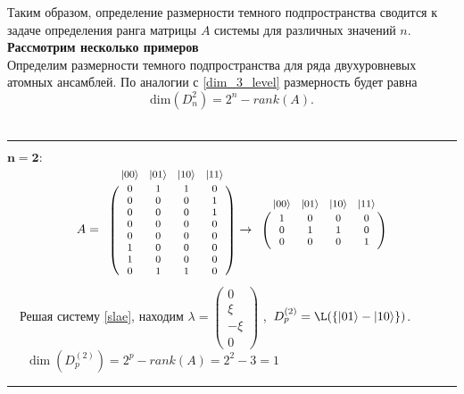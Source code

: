 \noindent Таким образом, определение размерности темного подпространства сводится к задаче определения ранга матрицы $A$ системы для различных значений $n$.
\\[24pt]
\noindent \textbf{Рассмотрим несколько примеров}\\[12pt]
Определим размерности темного подпространства для ряда двухуровневых атомных ансамблей. По аналогии с \eqref{dim_3_level} размерность будет равна
\begin{equation}
\mathrm{dim}(D_{n}^{2}) = 2^{n} - rank(A).
\end{equation}
\
\\
\medskip\hrule\medskip
\noindent$\mathbf{n = 2:}$
\begin{equation}\label{eq:matrix2}
	{\footnotesize
		A =
		\bordermatrix{
			& |00\ra & |01\ra & |10\ra & |11\ra \cr
			& 0 & 1 & 1 & 0 \cr
			& 0 & 0 & 0 & 1 \cr
			& 0 & 0 & 0 & 1 \cr
			& 0 & 0 & 0 & 0 \cr
			& 0 & 0 & 0 & 0 \cr
			& 1 & 0 & 0 & 0 \cr
			& 1 & 0 & 0 & 0 \cr
			& 0 & 1 & 1 & 0 \cr
		}\rightarrow
		\bordermatrix{
			& |00\ra & |01\ra & |10\ra & |11\ra \cr
			& 1 & 0 & 0 & 0 \cr
			& 0 & 1 & 1 & 0 \cr
			& 0 & 0 & 0 & 1 \cr
		}
	}
\end{equation}
\quad\quad~~Решая систему \eqref{slae}, находим
{\footnotesize
	$\lambda =
	\begin{pmatrix}
		0\\
		\xi\\
		-\xi\\
		0
	\end{pmatrix}
	$
},\
\quad$D^{(2)}_p = \L(\{|01\ra - |10\ra\})$.\\[12pt]

\noindent\quad\quad~~~$\dim(D^{(2)}_p) = 2^{p} - rank(A) = 2^{2} - 3 = 1$\\

\medskip\hrule\medskip

